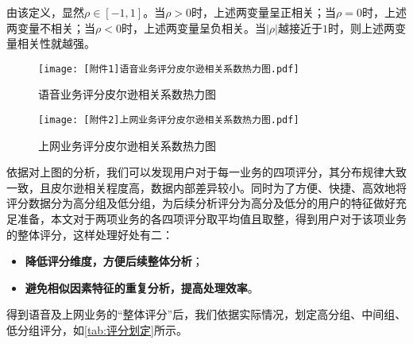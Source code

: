 \documentclass{MathorCupmodeling}
\begin{document}
	由该定义，显然$\rho\in[-1,1]$。当$\rho>0$时，上述两变量呈正相关；当$\rho=0$时，上述两变量不相关；当$\rho<0$时，上述两变量呈负相关。当$\left|\rho\right|$越接近于$1$时，则上述两变量相关性就越强\textcolor{blue}{\cite{ppearson}}。
	\begin{figure}[H]
		\centering
		\begin{minipage}{0.48\linewidth}
			\centering
			\texttt{[image: [附件1]语音业务评分皮尔逊相关系数热力图.pdf]}
			\caption{语音业务评分皮尔逊相关系数热力图}
			\label{fig:语音业务热力图}
		\end{minipage}
		\begin{minipage}{0.48\linewidth}
			\centering
			\texttt{[image: [附件2]上网业务评分皮尔逊相关系数热力图.pdf]}
			\caption{上网业务评分皮尔逊相关系数热力图}
			\label{fig:上网业务热力图}
		\end{minipage}
	\end{figure}
	依据对上图的分析，我们可以发现用户对于每一业务的四项评分，其分布规律大致一致，且皮尔逊相关程度高，数据内部差异较小。同时为了方便、快捷、高效地将评分数据分为高分组及低分组，为后续分析评分为高分及低分的用户的特征做好充足准备，本文对于两项业务的各四项评分取平均值且取整，得到用户对于该项业务的整体评分，这样处理好处有二：
	\begin{itemize}
		\item \textbf{降低评分维度，方便后续整体分析}；
		\item \textbf{避免相似因素特征的重复分析，提高处理效率}。
	\end{itemize}

	得到语音及上网业务的“整体评分”后，我们依据实际情况，划定高分组、中间组、低分组评分，如\textcolor{blue}{\cref{tab:评分划定}}所示。
	\begin{table}[H]
	\centering
	\caption{低分组、中间组、高分组评分划定及结果}
	\label{tab:评分划定}
  	\end{table}
\end{document}
